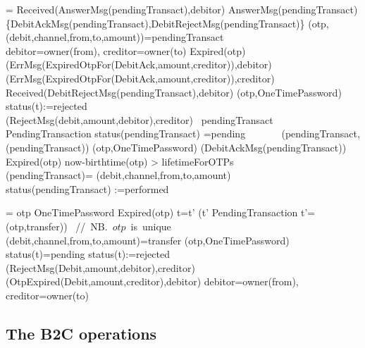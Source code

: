 \begin{asm}  
	 =\+           
	\IF Received(AnswerMsg(pendingTransact),\FROM debitor)\+
	\AND AnswerMsg(pendingTransact) \in \+
	\{DebitAckMsg(pendingTransact),DebitRejectMsg(pendingTransact)\} \THEN \dec \-
	\LET (otp, (debit,channel,from,to,amount))=pendingTransact \\
	\LET debitor=owner(from), creditor=owner(to)\+
	\IF Expired(otp) \THEN \+
	(ErrMsg(ExpiredOtpFor(DebitAck,amount,creditor)),\TO debitor) \\
	(ErrMsg(ExpiredOtpFor(DebitAck,amount,creditor)),\TO creditor)\-
	\ELSE ~\IF   
	Received(DebitRejectMsg(pendingTransact),\FROM debitor) \THEN \+
	(otp,OneTimePassword) \\
	status(t):=rejected\\
	(RejectMsg(debit,amount,debitor),\TO creditor)\-         
	\ELSE ~\IF pendingTransact  \in PendingTransaction \AND
	status(pendingTransact) =pending  \+
	\THEN \+
	\+
	~~~~~~ (pendingTransact,(pendingTransact))\-
	(otp,OneTimePassword)\dec\dec\-  
	(DebitAckMsg(pendingTransact)) \dec\dec\-
	\WHERE \+
	Expired(otp) \IFF now-birthtime(otp) > lifetimeForOTPs\\
	(pendingTransact)=\+
	(debit,channel,from,to,amount)\\
	status(pendingTransact) :=performed
\end{asm}

 
 \begin{asm}  
 	 =\+           
 	\IF otp \in OneTimePassword \AND Expired(otp)  \THEN  \+
 	\LET t=\iota t' (t'  \in PendingTransaction \AND 
 	t'=(otp,transfer)) \mbox{ // NB. $otp$ is unique}\\
 	\LET (debit,channel,from,to,amount)=transfer \+
 	(otp,OneTimePassword) \\
 	\IF status(t)=pending \THEN \+
 	status(t):=rejected\\
 	(RejectMsg(Debit,amount,debitor),\TO creditor)\\  
 	(OtpExpired(Debit,amount,creditor),\TO debitor)  \dec \-
 	\WHERE debitor=owner(from), creditor=owner(to)
 \end{asm}
 
 \subsection{The B2C operations}
 
